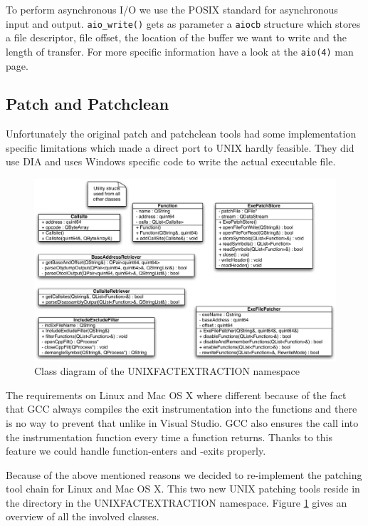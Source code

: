 To perform asynchronous I/O we use the POSIX standard for asynchronous input and output. \verb=aio_write()= gets as parameter a \verb=aiocb= structure which stores a file descriptor, file offset, the location of the buffer we want to write and the length of transfer. For more specific information have a look at the \verb=aio(4)= man page.

\subsection{Patch and Patchclean}

Unfortunately the original patch and patchclean tools had some implementation specific limitations which made a direct port to UNIX hardly feasible.  They did use DIA and  uses Windows specific code to write the actual executable file.

\begin{figure}[ht]
\centering
\includegraphics[width=16cm]{images/unixpatchtools}
\caption{Class diagram of the UNIXFACTEXTRACTION namespace} \label{fig:unixfe_unixfe}
\end{figure}

The requirements on Linux and Mac OS X where different because of the fact that GCC always compiles the exit instrumentation into the functions and there is no way to prevent that unlike in Visual Studio.  GCC also ensures the call into the instrumentation function every time a function returns.  Thanks to this feature we could handle function-enters and -exits properly.

Because of the above mentioned reasons we decided to re-implement the patching tool chain for Linux and Mac OS X.  This two new UNIX patching tools reside in the  directory in the UNIXFACTEXTRACTION namespace.  Figure \ref{fig:unixfe_unixfe} gives an overview of all the involved classes.

